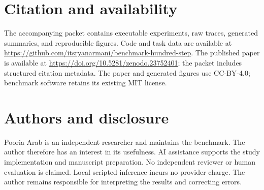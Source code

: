 \documentclass{article}
\begin{document}
\section{Citation and availability}
The accompanying packet contains executable experiments, raw traces, generated summaries, and reproducible figures. Code and task data are available at \url{https://github.com/itsryanarmani/benchmark-hundred-step}. The published paper is available at \url{https://doi.org/10.5281/zenodo.23752401}; the packet includes structured citation metadata. The paper and generated figures use CC-BY-4.0; benchmark software retains its existing MIT license.\par
\section{Authors and disclosure}
Pooria Arab is an independent researcher and maintains the benchmark. The author therefore has an interest in its usefulness. AI assistance supports the study implementation and manuscript preparation. No independent reviewer or human evaluation is claimed. Local scripted inference incurs no provider charge. The author remains responsible for interpreting the results and correcting errors.\par

\end{document}
